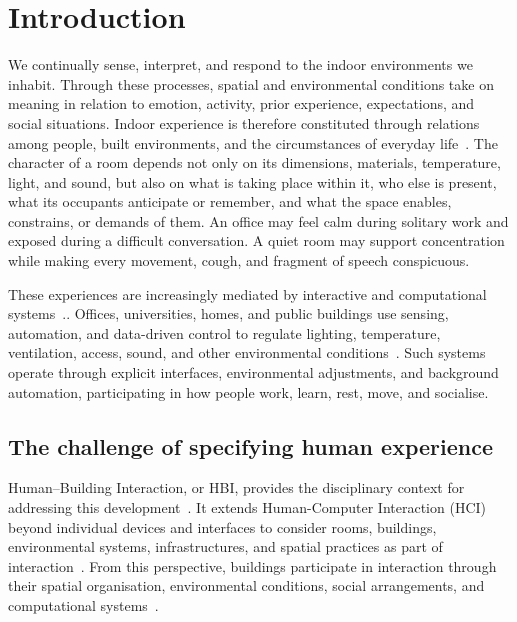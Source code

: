 \chapter{Introduction}
\label{ch:introduction}

\openingpara
{We continually sense, interpret, and respond to the indoor environments we inhabit.} {Through these processes, spatial and environmental conditions take on meaning in relation to emotion, activity, prior experience, expectations, and social situations. Indoor experience is therefore constituted through relations among people, built environments, and the circumstances of everyday life~\cite{wright2003making,dourish2001action}. The character of a room depends not only on its dimensions, materials, temperature, light, and sound, but also on what is taking place within it, who else is present, what its occupants anticipate or remember, and what the space enables, constrains, or demands of them. An office may feel calm during solitary work and exposed during a difficult conversation. A quiet room may support concentration while making every movement, cough, and fragment of speech conspicuous.}

These experiences are increasingly mediated by interactive and computational systems~\cite{alavi2019introduction, wiberg2020interaction}.. Offices, universities, homes, and public buildings use sensing, automation, and data-driven control to regulate lighting, temperature, ventilation, access, sound, and other environmental conditions~\cite{saputra2023smart, alavi2017comfort}. Such systems operate through explicit interfaces, environmental adjustments, and background automation, participating in how people work, learn, rest, move, and socialise.

\section{The challenge of specifying human experience}
Human--Building Interaction, or HBI, provides the disciplinary context for addressing this development~\cite{alavi2019introduction}. It extends Human-Computer Interaction (HCI) beyond individual devices and interfaces to consider rooms, buildings, environmental systems, infrastructures, and spatial practices as part of interaction~\cite{alavi2018artifacts, wiberg2008environment}. From this perspective, buildings participate in interaction through their spatial organisation, environmental conditions, social arrangements, and computational systems~\cite{rao2023towards}. 

